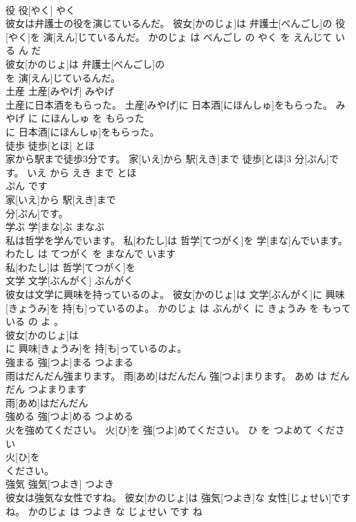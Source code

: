 \documentclass[8pt]{extreport}
\begin{document}
\begin{CJK}{UTF8}{min}
\\	役	役[やく]	やく	
\\	彼女は弁護士の役を演じているんだ。	彼女[かのじょ]は 弁護士[べんごし]の 役[やく]を 演[えん]じているんだ。	かのじょ は べんごし の やく を えんじて いる ん だ	
\\	彼女[かのじょ]は 弁護士[べんごし]の
\\	を 演[えん]じているんだ。			
\\	土産	土産[みやげ]	みやげ	
\\	土産に日本酒をもらった。	土産[みやげ]に 日本酒[にほんしゅ]をもらった。	みやげ に にほんしゅ を もらった	
\\	に 日本酒[にほんしゅ]をもらった。			
\\	徒歩	徒歩[とほ]	とほ	
\\	家から駅まで徒歩3分です。	家[いえ]から 駅[えき]まで 徒歩[とほ]3 分[ぷん]です。	いえ から えき まで とほ 
\\	ぷん です	
\\	家[いえ]から 駅[えき]まで
\\	分[ぷん]です。			
\\	学ぶ	学[まな]ぶ	まなぶ	
\\	私は哲学を学んでいます。	私[わたし]は 哲学[てつがく]を 学[まな]んでいます。	わたし は てつがく を まなんで います	
\\	私[わたし]は 哲学[てつがく]を
\\	文学	文学[ぶんがく]	ぶんがく	
\\	彼女は文学に興味を持っているのよ。	彼女[かのじょ]は 文学[ぶんがく]に 興味[きょうみ]を 持[も]っているのよ。	かのじょ は ぶんがく に きょうみ を もっている の よ 。	
\\	彼女[かのじょ]は
\\	に 興味[きょうみ]を 持[も]っているのよ。			
\\	強まる	強[つよ]まる	つよまる	
\\	雨はだんだん強まります。	雨[あめ]はだんだん 強[つよ]まります。	あめ は だんだん つよまります	
\\	雨[あめ]はだんだん
\\	強める	強[つよ]める	つよめる	
\\	火を強めてください。	火[ひ]を 強[つよ]めてください。	ひ を つよめて ください	
\\	火[ひ]を
\\	ください。			
\\	強気	強気[つよき]	つよき	
\\	彼女は強気な女性ですね。	彼女[かのじょ]は 強気[つよき]な 女性[じょせい]ですね。	かのじょ は つよき な じょせい です ね	

\end{CJK}
\end{document}
